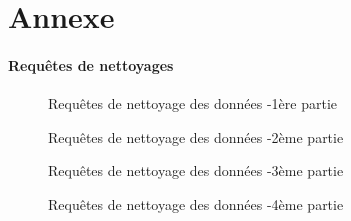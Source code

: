 \documentclass[a4paper, 11pt]{article}
\begin{document}
\section{Annexe}
\paragraph*{Requêtes de nettoyages}
\begin{figure}[H]
  
  \caption{Requêtes de nettoyage des données -1ère partie}
  \label{fig:setup-access}
\end{figure}
\par\bigskip
\begin{figure}[H]
  
  \caption{Requêtes de nettoyage des données -2ème partie}
  \label{fig:setup-access-2}
\end{figure}
\par\bigskip
\begin{figure}[H]
  
  \caption{Requêtes de nettoyage des données -3ème partie}
  \label{fig:setup-access-3}
\end{figure}
\par\bigskip
\begin{figure}[H]
  
  \caption{Requêtes de nettoyage des données -4ème partie}
  \label{fig:setup-access-4}
\end{figure}
\end{document}
